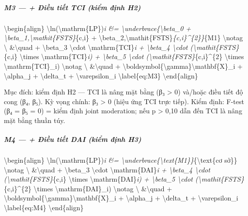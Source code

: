 \documentclass[12pt,a4paper]{article}
\begin{document}
\hypertarget{m3---ux111iux1ec1u-tiux1ebft-tci-kiux1ec3m-ux111ux1ecbnh-h2}{%
\subparagraph{M3 --- + Điều tiết TCI (kiểm định
H2)}\label{m3---ux111iux1ec1u-tiux1ebft-tci-kiux1ec3m-ux111ux1ecbnh-h2}}

\textbackslash begin\{align\}
\textbackslash ln(\textbackslash mathrm\{LP\})\emph{i \&=
\textbackslash underbrace\{\textbackslash beta\_0 +
\textbackslash beta\_1,\textbackslash mathit\{FSTS\}}\{c,i\} +
\textbackslash beta\_2,\textbackslash mathit\{FSTS\}\emph{\{c,i\}\^{}\{2\}\}}\{M1\}
\textbackslash notag \textbackslash{} \&\textbackslash quad +
\textbackslash beta\_3 \textbackslash cdot
\textbackslash mathrm\{TCI\}\emph{i + \textbackslash beta\_4
\textbackslash cdot (\textbackslash mathit\{FSTS\}}\{c,i\}
\textbackslash times \textbackslash mathrm\{TCI\}\emph{i) +
\textbackslash beta\_5 \textbackslash cdot
(\textbackslash mathit\{FSTS\}}\{c,i\}\^{}\{2\} \textbackslash times
\textbackslash mathrm\{TCI\}\_i) \textbackslash notag \textbackslash{}
\&\textbackslash quad +
\textbackslash boldsymbol\{\textbackslash gamma\}\textquotesingle\textbackslash mathbf\{X\}\_i
+ \textbackslash alpha\_j + \textbackslash delta\_t +
\textbackslash varepsilon\_i \textbackslash label\{eq:M3\}
\textbackslash end\{align\}

Mục đích: kiểm định H2 --- TCI là nâng mặt bằng (β₃ \textgreater{} 0)
và/hoặc điều tiết độ cong (β₄, β₅). Kỳ vọng chính: β₃ \textgreater{} 0
(hiệu ứng TCI trực tiếp). Kiểm định: F-test (β₄ = β₅ = 0) = kiểm định
joint moderation; nếu p \textgreater{} 0,10 dẫn đến TCI là nâng mặt bằng
thuần túy.

\hypertarget{m4---ux111iux1ec1u-tiux1ebft-dai-kiux1ec3m-ux111ux1ecbnh-h3}{%
\subparagraph{M4 --- + Điều tiết DAI (kiểm định
H3)}\label{m4---ux111iux1ec1u-tiux1ebft-dai-kiux1ec3m-ux111ux1ecbnh-h3}}

\textbackslash begin\{align\}
\textbackslash ln(\textbackslash mathrm\{LP\})\emph{i \&=
\textbackslash underbrace\{\textbackslash text\{M1\}\}}\{\textbackslash text\{cơ
sở\}\} \textbackslash notag \textbackslash{} \&\textbackslash quad +
\textbackslash beta\_3 \textbackslash cdot
\textbackslash mathrm\{DAI\}\emph{i + \textbackslash beta\_4
\textbackslash cdot (\textbackslash mathit\{FSTS\}}\{c,i\}
\textbackslash times \textbackslash mathrm\{DAI\}\emph{i) +
\textbackslash beta\_5 \textbackslash cdot
(\textbackslash mathit\{FSTS\}}\{c,i\}\^{}\{2\} \textbackslash times
\textbackslash mathrm\{DAI\}\_i) \textbackslash notag \textbackslash{}
\&\textbackslash quad +
\textbackslash boldsymbol\{\textbackslash gamma\}\textquotesingle\textbackslash mathbf\{X\}\_i
+ \textbackslash alpha\_j + \textbackslash delta\_t +
\textbackslash varepsilon\_i \textbackslash label\{eq:M4\}
\textbackslash end\{align\}
\end{document}
